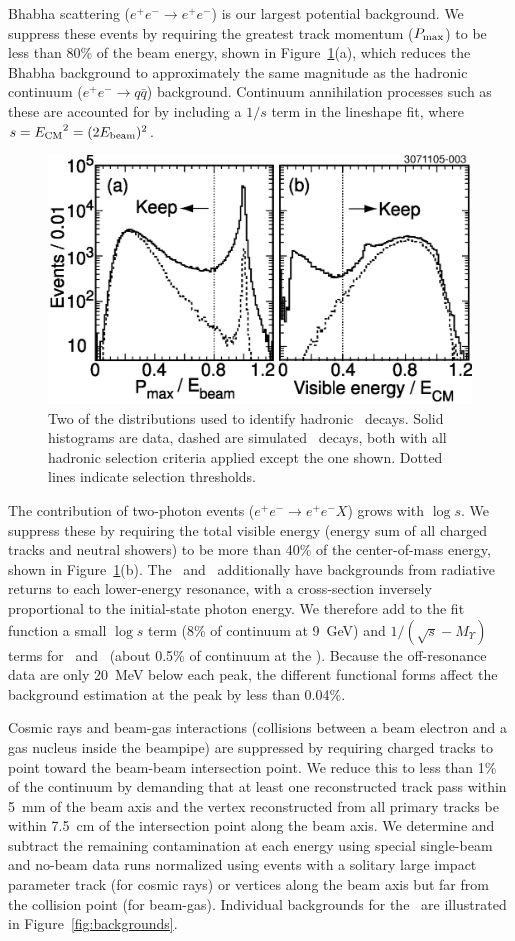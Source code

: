 \documentclass[aps,prd,preprint,superscriptaddress,tightenlines,nofootinbib]{revtex4}
\begin{document}
Bhabha scattering ($e^+e^- \to e^+e^-$) is our largest potential
background.  We suppress these events by requiring the greatest track
momentum ($P_{\mbox{\scriptsize max}}$) to be less than 80\% of the
beam energy, shown in Figure~\ref{fig:cuts}(a), which reduces the
Bhabha background to approximately the same magnitude as the hadronic
continuum ($e^+e^- \to q\bar{q}$) background.  Continuum annihilation
processes such as these are accounted for by including a $1/s$ term in
the lineshape fit, where $s = {E_{\mbox{\scriptsize CM}}}^2 = (2
E_{\mbox{\scriptsize beam}})^2$.

\begin{figure}
  \includegraphics[width=0.5\linewidth]{cuts}
  \caption{\label{fig:cuts} Two of the distributions used to identify
hadronic \ups\ decays.  Solid histograms are data, dashed are
simulated \us\ decays, both with all hadronic selection criteria
applied except the one shown.  Dotted lines indicate selection
thresholds.}
\end{figure}

The contribution of two-photon events ($e^+e^- \to e^+e^- X$) grows
with $\log s$.  We suppress these by requiring the total visible
energy (energy sum of all charged tracks and neutral showers) to be
more than 40\% of the center-of-mass energy, shown in
Figure~\ref{fig:cuts}(b).  The \uss\ and \usss\ additionally have
backgrounds from radiative returns to each lower-energy resonance,
with a cross-section inversely proportional to the initial-state
photon energy.  We therefore add to the fit function a small $\log s$
term (8\% of continuum at 9~GeV) and $1/(\sqrt{s}-M_\Upsilon)$ terms
for \us\ and \uss\ (about 0.5\% of continuum at the \usss).  Because
the off-resonance data are only 20~MeV below each peak, the different
functional forms affect the background estimation at the peak by less
than 0.04\%.

Cosmic rays and beam-gas interactions (collisions between a beam
electron and a gas nucleus inside the beampipe) are suppressed by
requiring charged tracks to point toward the beam-beam intersection
point.  We reduce this to less than 1\% of the continuum by demanding
that at least one reconstructed track pass within 5~mm of the beam
axis and the vertex reconstructed from all primary tracks be within
7.5~cm of the intersection point along the beam axis.  We determine
and subtract the remaining contamination at each energy using special
single-beam and no-beam data runs normalized using events with a
solitary large impact parameter track (for cosmic rays) or vertices
along the beam axis but far from the collision point (for beam-gas).
Individual backgrounds for the \usss\ are illustrated in Figure~\ref{fig:backgrounds}.
\end{document}
